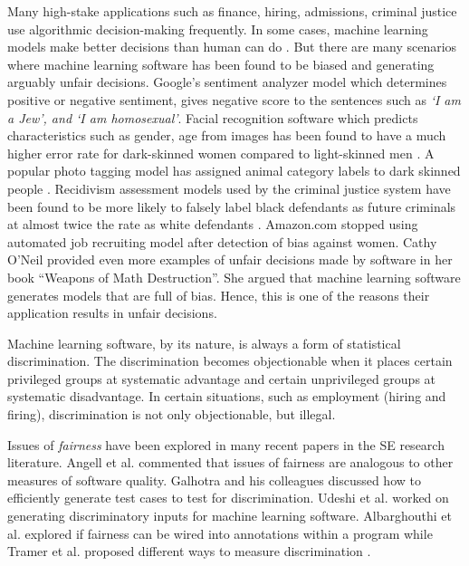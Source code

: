 \documentclass{NSF}
\begin{document}
\begin{nsfdescription}
Many high-stake applications such as finance, hiring, admissions, criminal justice use algorithmic decision-making frequently. In some cases, machine learning models make better decisions than human can do \cite{Brun:2018:SF:3236024.3264838,Aydemir:2018:RES:3194770.3194778}. But there are many scenarios where machine learning software has been found to be biased and generating arguably unfair decisions. Google's sentiment analyzer model which determines positive or negative sentiment, gives negative score to the sentences such as \textit{`I am a Jew', and `I am homosexual'}\cite{Google_Sentiment}. Facial recognition software which predicts characteristics such as gender, age from images has been found to have a much higher error rate for dark-skinned women compared to light-skinned men \cite{Gender_Bias}. A popular photo tagging model has assigned animal category labels to dark skinned people \cite{Google_Photo}. Recidivism assessment models used by the criminal justice system have been found to be more likely to falsely label black defendants as future criminals at almost twice the rate as white defendants \cite{Machine_Bias}. Amazon.com stopped using automated job recruiting model after detection of bias against women\cite{Amazon_Bias}. Cathy O'Neil provided even more examples of unfair decisions made by software in her book ``Weapons of Math Destruction''\cite{O'Neil:2016:WMD:3002861}. She argued that machine learning software generates models that are full of bias. Hence, this is one of the reasons their application results in unfair decisions.


Machine learning software, by its nature, is always a form of statistical discrimination. The discrimination becomes objectionable when it places certain privileged groups at systematic advantage and certain unprivileged groups at systematic disadvantage. In certain situations, such as employment (hiring and firing), discrimination is not only objectionable, but illegal.


Issues of \textit{fairness} have been explored in many  recent papers in the SE research literature. Angell et al. \cite{Angell:2018:TAT:3236024.3264590}  commented that issues of fairness are analogous to other measures of software quality. Galhotra and his colleagues discussed how to efficiently generate test cases to test for discrimination\cite{Galhotra_2017}. Udeshi et al. \cite{Udeshi_2018} worked on generating discriminatory  inputs for machine learning software. Albarghouthi et al. \cite{Albarghouthi:2019:FP:3287560.3287588} explored if fairness can be wired into annotations within a program while Tramer et al. proposed different ways to measure discrimination \cite{Tramer_2017}.


\end{nsfdescription}
\end{document}
